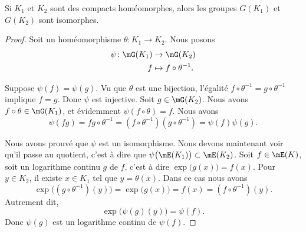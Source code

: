 \begin{lemma}     \label{LEMooHEOWooHTtHsJ}
	Si \( K_1\) et \( K_2\) sont des compacts homéomorphes, alors les groupes \( G(K_1)\) et \( G(K_2)\) sont isomorphes.
\end{lemma}

\begin{proof}
	Soit un homéomorphisme \( \theta\colon K_1\to K_2\). Nous posons
	\begin{equation}
		\begin{aligned}
			\psi\colon \mG(K_1) & \to \mG(K_2)                \\
			f                   & \mapsto f\circ \theta^{-1}.
		\end{aligned}
	\end{equation}
	\begin{subproof}
		\spitem[Injective]
		Suppose \( \psi(f)=\psi(g)\). Vu que \( \theta\) est une bijection, l'égalité \( f\circ \theta^{-1}=g\circ\theta^{-1}\) implique \( f=g\). Donc \( \psi\) est injective.
		\spitem[Surjective]
		Soit \( g\in\mG(K_2)\). Nous avons \( f\circ\theta\in\mG(K_1)\), et évidemment \( \psi(f\circ\theta)=f\).
		\spitem[Morphisme]
		Nous avons
		\begin{equation}
			\psi(fg)=fg\circ\theta^{-1}=(f\circ\theta^{-1})(g\circ\theta^{-1})=\psi(f)\psi(g).
		\end{equation}
	\end{subproof}
	Nous avons prouvé que \( \psi\) est un isomorphisme. Nous devons maintenant voir qu'il passe au quotient, c'est à dire que \( \psi\big( \mE(K_1) \big)\subset\mE(K_2)\). Soit \( f\in\mE(K)\), soit un logarithme continu \( g\) de \( f\), c'est à dire \( \exp\big( g(x) \big)=f(x)\). Pour \( y\in K_2\), il existe \( x\in K_1\) tel que \( y=\theta(x)\). Dans ce cas nous avons
	\begin{equation}
		\exp\big( (g\circ\theta^{-1})(y) \big)=\exp\big( g(x) \big)=f(x)=(f\circ\theta^{-1})(y).
	\end{equation}
	Autrement dit,
	\begin{equation}
		\exp\big( \psi(g)(y) \big)=\psi(f).
	\end{equation}
	Donc \( \psi(g)\) est un logarithme continu de \( \psi(f)\).
\end{proof}

